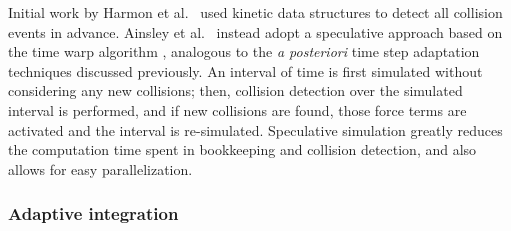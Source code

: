 Initial work by Harmon et al.~\cite{Harmon2009} used kinetic data structures to detect all collision events in advance.
Ainsley et al.~\cite{Ainsley2012} instead adopt a speculative approach based on the time warp algorithm \cite{Jefferson1985, Mirtich2000}, analogous to the \textit{a posteriori} time step adaptation techniques discussed previously.
An interval of time is first simulated without considering any new collisions; then, collision detection over the simulated interval is performed, and if new collisions are found, those force terms are activated and the interval is re-simulated.
Speculative simulation greatly reduces the computation time spent in bookkeeping and collision detection, and also allows for easy parallelization.

\subsubsection{Adaptive integration}
\label{sec:adaptive-integration}

